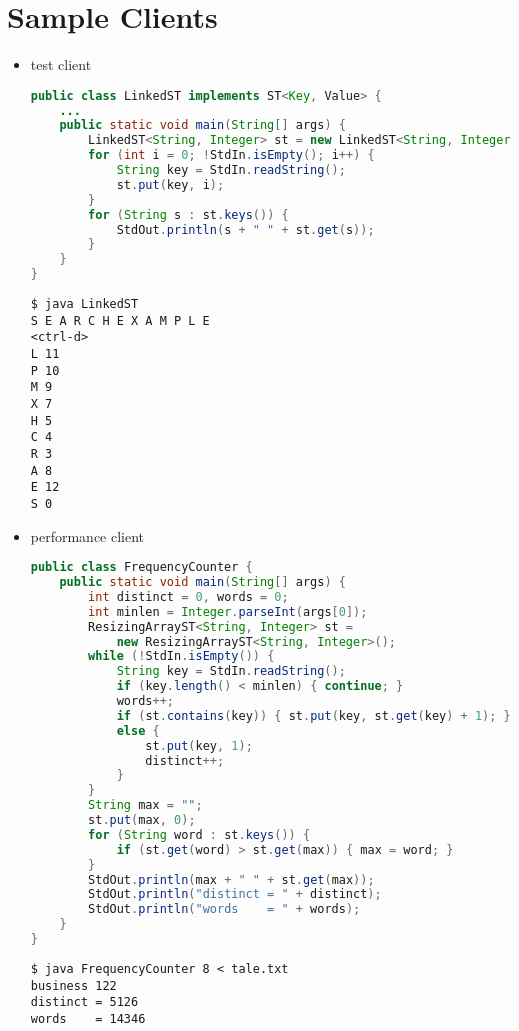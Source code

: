 \documentclass[8pt,a4paper,compress]{beamer}
\begin{document}
\section{Sample Clients}
\begin{frame}[fragile]
\begin{itemize}
\item test client
\begin{lstlisting}[language=Java]
public class LinkedST implements ST<Key, Value> {
    ...
    public static void main(String[] args) {
        LinkedST<String, Integer> st = new LinkedST<String, Integer>();
        for (int i = 0; !StdIn.isEmpty(); i++) {
            String key = StdIn.readString();
            st.put(key, i);
        }
        for (String s : st.keys()) {
            StdOut.println(s + " " + st.get(s));
        }
    }
}
\end{lstlisting}

\begin{lstlisting}[language={}]
$ java LinkedST 
S E A R C H E X A M P L E
<ctrl-d>
L 11
P 10
M 9
X 7
H 5
C 4
R 3
A 8
E 12
S 0
\end{lstlisting}
\end{itemize}
\end{frame}

\begin{frame}[fragile]
\begin{itemize}
\item performance client
\begin{lstlisting}[language=Java]
public class FrequencyCounter {
    public static void main(String[] args) {
        int distinct = 0, words = 0;
        int minlen = Integer.parseInt(args[0]);
        ResizingArrayST<String, Integer> st = 
            new ResizingArrayST<String, Integer>();
        while (!StdIn.isEmpty()) {
            String key = StdIn.readString();
            if (key.length() < minlen) { continue; }
            words++;
            if (st.contains(key)) { st.put(key, st.get(key) + 1); }
            else {
                st.put(key, 1);
                distinct++;
            }
        }
        String max = "";
        st.put(max, 0);
        for (String word : st.keys()) {
            if (st.get(word) > st.get(max)) { max = word; }
        }
        StdOut.println(max + " " + st.get(max));
        StdOut.println("distinct = " + distinct);
        StdOut.println("words    = " + words);
    }
}
\end{lstlisting}

\begin{lstlisting}[language={}]
$ java FrequencyCounter 8 < tale.txt 
business 122
distinct = 5126
words    = 14346
\end{lstlisting}
\end{itemize}
\end{frame}
\end{document}
